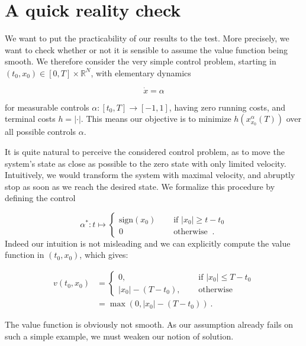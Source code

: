 
	\section{A quick reality check}
	
	\label{non-smooth}
	
	We want to put the practicability of our results to the test. More precisely, we want to check whether or not it is sensible to assume the value function being smooth. We therefore consider the very simple control problem, starting in $ (t_0, x_0) \in \left[ 0 , T \right] \times \mathbb{R}^N $, with elementary dynamics
	
	\begin{equation*}
		\dot{x} = \alpha
	\end{equation*}
	
	for measurable controls $ \alpha : \left[ t_0, T \right] \to \left[-1, 1\right] $, having zero running costs, and terminal costs $ h = \lvert \cdot \rvert $. This means our objective is to minimize $ h(x^{\alpha}_{x_0}(T)) $ over all possible controls $ \alpha $.
	
	It is quite natural to perceive the considered control problem, as to move the system's state as close as possible to the zero state with only limited velocity. Intuitively, we would transform the system with maximal velocity, and abruptly stop as soon as we reach the desired state. We formalize this procedure by defining the control
	
	\begin{equation*}
		\alpha^{*} : t \mapsto \begin{cases}
		\text{sign}(x_0) \quad &\text{ if } \lvert x_0 \rvert \geq t - t_0 \\
		0 \quad &\text{ otherwise } \ .
		\end{cases}
	\end{equation*}
	Indeed our intuition is not misleading and we can explicitly compute the value function in $ (t_0, x_0) $, which gives:
	
	\begin{align*}
		v(t_0, x_0) &= \begin{cases}
		0, \quad &\text{ if } |x_0| \leq T - t_0 \\
		|x_0| - (T - t_0), \quad &\text{ otherwise }
		\end{cases} \\
		&= \max(0, |x_0| - (T - t_0)) \ .
	\end{align*}
	
	The value function is obviously not smooth. As our assumption already fails on such a simple example, we must weaken our notion of solution.
	
